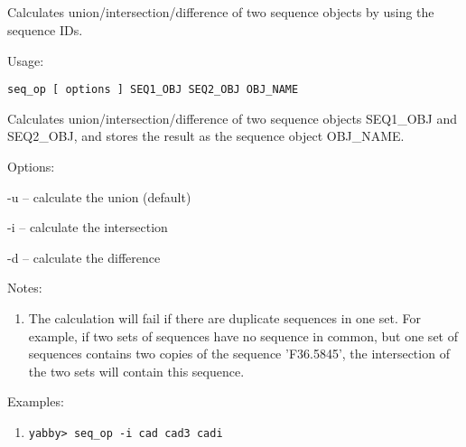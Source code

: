 

\subsection[seq\_op]{  }



Calculates union/intersection/difference of two sequence objects
by using the sequence IDs.


\begin{description}


\item{Usage:}

{\tt seq\_op [ options ] SEQ1\_OBJ SEQ2\_OBJ OBJ\_NAME}

Calculates union/intersection/difference of two sequence objects
SEQ1\_OBJ and SEQ2\_OBJ, and stores the result as the sequence
object OBJ\_NAME.


\item{Options:}
\begin{description}
\item -u -- calculate the union (default)
\item -i -- calculate the intersection
\item -d -- calculate the difference
\end{description}


\item{Notes:}
\begin{enumerate}
\item The calculation will fail if there are duplicate sequences in
      one set. For example, if two sets of sequences have no sequence
      in common, but one set of sequences contains two copies of the
      sequence 'F36.5845', the intersection of the two sets will contain
      this sequence.
\end{enumerate}


\item{Examples:}
\begin{enumerate}

\item
\begin{verbatim}
yabby> seq_op -i cad cad3 cadi


\end{verbatim}
\end{enumerate}
\end{description}
